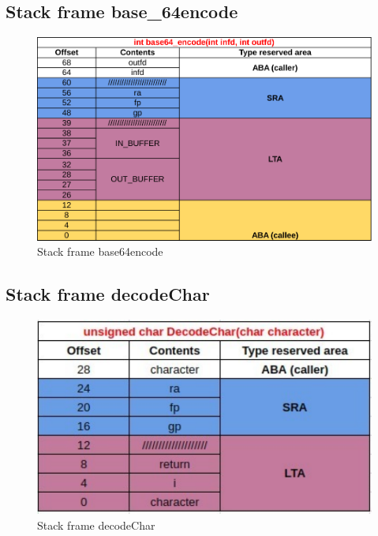 \documentclass[11pt,a4paper]{article}
\begin{document}
\subsection{Stack frame base\_64encode}
\begin{figure}[H]
  \centering
    \includegraphics[width=14cm]{base64encodeStackFrame}
    \caption{Stack frame base64encode}
  \label{fig:base64encodeStackFrame}
\end{figure}

\subsection{Stack frame decodeChar}
\begin{figure}[H]
  \centering
    \includegraphics[width=14cm]{decodeCharStackFrame}
    \caption{Stack frame decodeChar}
  \label{fig:decodeCharStackFrame}
\end{figure}
\end{document}
